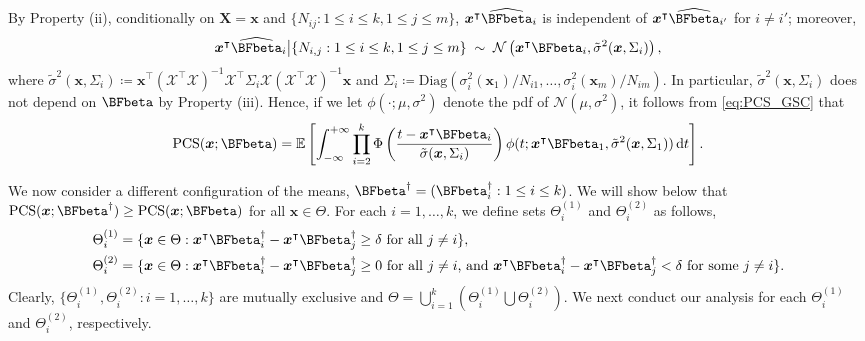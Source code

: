 \documentclass[ijoc,nonblindrev]{informs3}
\def\E{\mathbb{E}}
\def\ud{\mathrm{d}}
\def\bx{{\bm x}}
\def\bX{{\bm X}}
\def\cN{{\mathcal N}}
\def\cX{{\mathcal X}}
\def\PCS{\mathrm{PCS}}
\begin{document}
By Property (ii), conditionally on $\bX=\bx$ and $\{N_{ij}: 1 \leq i \leq k, 1\leq j\leq m\}$,  $\bx^\intercal \widehat{\BFbeta}_i$ is independent of $\bx^\intercal \widehat{\BFbeta}_{i'}$ for $i\neq i'$;
moreover,
\[\bx^\intercal \widehat{\BFbeta}_i \big| \{N_{i,j}: 1 \leq i \leq k, 1\leq j\leq m\} \; \sim \; \cN\left(\bx^\intercal \BFbeta_i, \tilde\sigma^2(\bx,\Sigma_i) \right),\]
where $\tilde\sigma^2(\bx,\Sigma_i)\coloneqq \bx^\intercal (\cX^\intercal \cX)^{-1} \cX^\intercal \Sigma_i \cX (\cX^\intercal \cX)^{-1} \bx$ and $\Sigma_i \coloneqq \mathrm{Diag}(\sigma_i^2(\bx_1)/N_{i1}, \ldots, \sigma_i^2(\bx_m)/N_{im})$.
In particular, $\tilde\sigma^2(\bx,\Sigma_i)$ does not depend on $\BFbeta$ by Property (iii).
Hence, if we let $\phi(\cdot; \mu,\sigma^2)$ denote the pdf of $\cN(\mu,\sigma^2)$, it follows from \eqref{eq:PCS_GSC} that
\begin{align} \label{eq-case-GSC}
\PCS(\bx;\BFbeta) = \E \left[ \int_{-\infty}^{+\infty} \prod_{i=2}^k \Phi \left( \frac{t - \bx^\intercal \BFbeta_i}{\tilde\sigma(\bx,\Sigma_i)} \right)
\phi (t; \bx^\intercal \BFbeta_1, \tilde\sigma^2(\bx,\Sigma_1))\,\ud t  \right].
\end{align}

We now consider a different configuration of the means, $\BFbeta^\dagger=(\BFbeta^\dagger_i:1\leq i\leq k)$.
We will show below that $\PCS(\bx;\BFbeta^\dagger) \geq \PCS(\bx;\BFbeta) $ for all $\bx\in\Theta$.
For each $i=1,\ldots,k$, we define sets $\Theta_i^{(1)}$ and $\Theta_i^{(2)}$ as follows,
\begin{align*}
&\Theta_i^{(1)} = \{\bx \in \Theta : \bx^\intercal \BFbeta_i^\dag - \bx^\intercal \BFbeta_j^\dag \geq \delta \mbox{ for all $j\neq i$} \}, \\
&\Theta_i^{(2)} = \{\bx \in \Theta : \bx^\intercal \BFbeta_i^\dag - \bx^\intercal \BFbeta_j^\dag \geq 0 \mbox{ for all $j\neq i$, and } \bx^\intercal \BFbeta_i^\dag - \bx^\intercal \BFbeta_j^\dag < \delta \mbox{ for some $j\neq i$} \}.
\end{align*}
Clearly,  $\{\Theta_i^{(1)}, \Theta_i^{(2)}:i=1,\ldots,k\}$ are mutually exclusive and $\Theta = \bigcup_{i=1}^k \left(\Theta_i^{(1)} \bigcup \Theta_i^{(2)}\right)$.
We next conduct our analysis for each $\Theta_i^{(1)}$ and $\Theta_i^{(2)}$, respectively.
\end{document}
